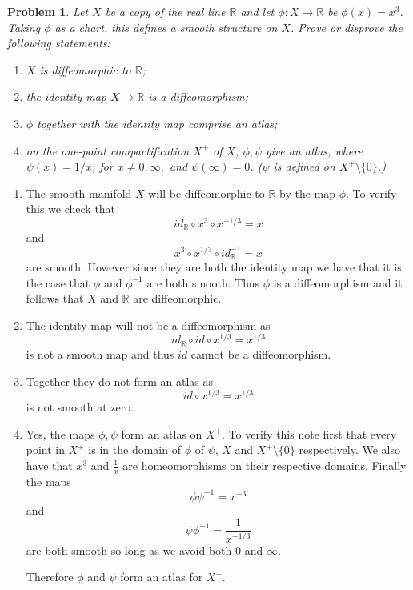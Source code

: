 \documentclass[10pt]{article}
\newcommand{\bb}[1]{\mathbb{#1}}
\theoremstyle{plain}
\newtheorem{problem}{Problem}
\theoremstyle{remark}
\begin{document}
\begin{problem}
  Let $X$ be a copy of the real line $\bb{R}$ and let $\phi:X\rightarrow\bb{R}$ be
  $\phi(x)=x^3$. Taking $\phi$ as a chart, this defines a smooth structure on
  $X$. Prove or disprove the following statements:
  \begin{enumerate}
  \item $X$ is diffeomorphic to $\bb{R}$;
  \item the identity map $X\rightarrow\bb{R}$ is a diffeomorphism;
  \item $\phi$ together with the identity map comprise an atlas;
  \item on the one-point compactification $X^+$ of $X$, $\phi,\psi$ give an
    atlas, where $\psi(x)=1/x$, for $x\neq 0,\infty,$ and $\psi(\infty)=0$. ($\psi$ is defined
    on $X^+\setminus\{0\}$.)
  \end{enumerate}
\end{problem}

\begin{enumerate}
\item The smooth manifold $X$ will be diffeomorphic to $\bb{R}$ by the map
  $\phi$. To verify this we check that
  \[ id_{\bb{R}}\circ x^3\circ x^{-1/3}=x\]
  and
  \[ x^3\circ x^{1/3}\circ id_{\bb{R}}^{-1}=x\]
  are smooth. However since they are both the identity map we have that it is
  the case that $\phi$ and $\phi^{-1}$ are both smooth. Thus $\phi$ is a diffeomorphism
  and it follows that $X$ and $\bb{R}$ are diffeomorphic.
  
\item The identity map will not be a diffeomorphism as
  \[ id_{\bb{R}}\circ id\circ x^{1/3}=x^{1/3}\]
  is not a smooth map and thus $id$ cannot be a diffeomorphism.
  
\item Together they do not form an atlas as
  \[ id\circ x^{1/3}=x^{1/3}\]
  is not smooth at zero.
  
\item Yes, the maps $\phi,\psi$ form an atlas on $X^+$. To verify this note
  first that every point in $X^+$ is in the domain of $\phi$ of $\psi$,
  $X$ and $X^+\setminus\{0\}$ respectively. We also have that $x^3$ and $\frac{1}{x}$ are
  homeomorphisms on their respective domains. Finally the maps
  \[ \phi\psi^{-1}=x^{-3}\]
  and
  \[ \psi\phi^{-1}=\frac{1}{x^{-1/3}}\]
  are both smooth so long as we avoid both $0$ and $\infty$.

  Therefore $\phi$ and $\psi$ form an atlas for $X^+$.
\end{enumerate}

\end{document}
